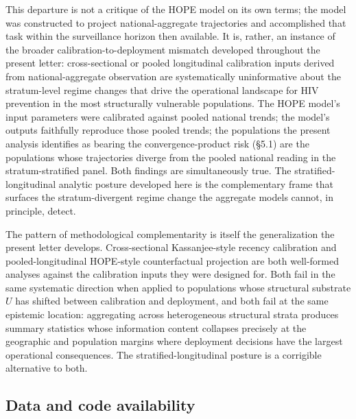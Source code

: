 \documentclass[11pt]{article}
\begin{document}
This departure is not a critique of the HOPE model on its own terms; the model was constructed to project national-aggregate trajectories and accomplished that task within the surveillance horizon then available. It is, rather, an instance of the broader calibration-to-deployment mismatch developed throughout the present letter: cross-sectional or pooled longitudinal calibration inputs derived from national-aggregate observation are systematically uninformative about the stratum-level regime changes that drive the operational landscape for HIV prevention in the most structurally vulnerable populations. The HOPE model's input parameters were calibrated against pooled national trends; the model's outputs faithfully reproduce those pooled trends; the populations the present analysis identifies as bearing the convergence-product risk (§5.1) are the populations whose trajectories diverge from the pooled national reading in the stratum-stratified panel. Both findings are simultaneously true. The stratified-longitudinal analytic posture developed here is the complementary frame that surfaces the stratum-divergent regime change the aggregate models cannot, in principle, detect.

The pattern of methodological complementarity is itself the generalization the present letter develops. Cross-sectional Kassanjee-style recency calibration and pooled-longitudinal HOPE-style counterfactual projection are both well-formed analyses against the calibration inputs they were designed for. Both fail in the same systematic direction when applied to populations whose structural substrate $U$ has shifted between calibration and deployment, and both fail at the same epistemic location: aggregating across heterogeneous structural strata produces summary statistics whose information content collapses precisely at the geographic and population margins where deployment decisions have the largest operational consequences. The stratified-longitudinal posture is a corrigible alternative to both.
\subsection{Data and code availability}\label{sec:S8_data_avail}\label{sec:code_data}
\end{document}

